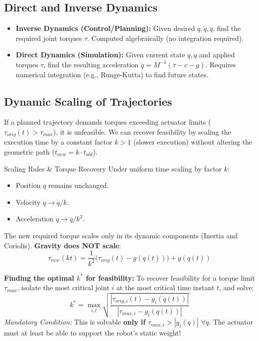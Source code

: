 \documentclass[11pt,a4paper]{article}
\begin{document}
\subsection{Direct and Inverse Dynamics}
\begin{itemize}
    \item \textbf{Inverse Dynamics (Control/Planning):} Given desired $q, \dot{q}, \ddot{q}$, find the required joint torques $\tau$. Computed algebraically (no integration required).
    \item \textbf{Direct Dynamics (Simulation):} Given current state $q, \dot{q}$ and applied torques $\tau$, find the resulting acceleration $\ddot{q} = M^{-1}(\tau - c - g)$. Requires numerical integration (e.g., Runge-Kutta) to find future states.
\end{itemize}

\subsection{Dynamic Scaling of Trajectories}
If a planned trajectory demands torques exceeding actuator limits ($\tau_{orig}(t) > \tau_{max}$), it is unfeasible. We can recover feasibility by scaling the execution time by a constant factor $k > 1$ (slower execution) without altering the geometric path ($t_{new} = k \cdot t_{old}$).

\begin{recipebox}{Scaling Rules \& Torque Recovery}
Under uniform time scaling by factor $k$:
\begin{itemize}
    \item Position $q$ remains unchanged.
    \item Velocity $\dot{q} \rightarrow \dot{q}/k$.
    \item Acceleration $\ddot{q} \rightarrow \ddot{q}/k^2$.
\end{itemize}
The new required torque scales only in its dynamic components (Inertia and Coriolis). \textbf{Gravity does NOT scale}:
\begin{equation}
    \tau_{new}(kt) = \frac{1}{k^2} \Big( \tau_{orig}(t) - g(q(t)) \Big) + g(q(t))
\end{equation}
\end{recipebox}

\begin{examtip}
    \textbf{Finding the optimal $k^*$ for feasibility:}
    To recover feasibility for a torque limit $\tau_{max}$, isolate the most critical joint $i$ at the most critical time instant $t$, and solve:
    \[ k^* = \max_{i, t} \sqrt{\frac{|\tau_{orig, i}(t) - g_i(q(t))|}{|\tau_{max, i} - g_i(q(t))|}} \]
    \textit{Mandatory Condition:} This is solvable \textbf{only if} $\tau_{max, i} > |g_i(q)| \,\, \forall q$. The actuator must at least be able to support the robot's static weight!
\end{examtip}
\end{document}
